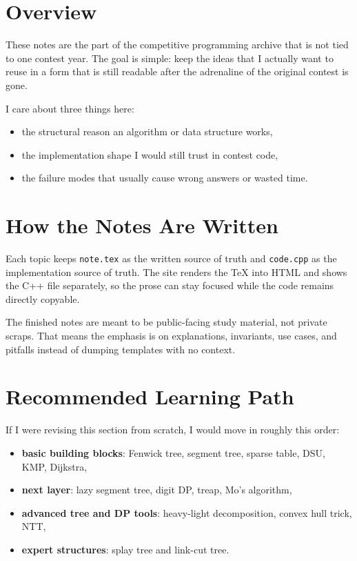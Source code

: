 \section*{Overview}

These notes are the part of the competitive programming archive that is not tied to one contest year.
The goal is simple: keep the ideas that I actually want to reuse in a form that is still readable after
the adrenaline of the original contest is gone.

I care about three things here:

\begin{itemize}
  \item the structural reason an algorithm or data structure works,
  \item the implementation shape I would still trust in contest code,
  \item the failure modes that usually cause wrong answers or wasted time.
\end{itemize}

\section*{How the Notes Are Written}

Each topic keeps \texttt{note.tex} as the written source of truth and \texttt{code.cpp} as the implementation
source of truth. The site renders the TeX into HTML and shows the C++ file separately, so the prose can stay
focused while the code remains directly copyable.

The finished notes are meant to be public-facing study material, not private scraps. That means the emphasis is
on explanations, invariants, use cases, and pitfalls instead of dumping templates with no context.

\section*{Recommended Learning Path}

If I were revising this section from scratch, I would move in roughly this order:

\begin{itemize}
  \item \textbf{basic building blocks}: Fenwick tree, segment tree, sparse table, DSU, KMP, Dijkstra,
  \item \textbf{next layer}: lazy segment tree, digit DP, treap, Mo's algorithm,
  \item \textbf{advanced tree and DP tools}: heavy-light decomposition, convex hull trick, NTT,
  \item \textbf{expert structures}: splay tree and link-cut tree.
\end{itemize}

